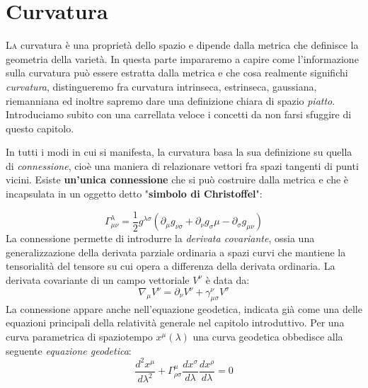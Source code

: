 \documentclass[twoside]{article}
\begin{document}
\newpage

\section{Curvatura}

\lettrine[nindent=0em,lines=3]{L}a curvatura è una proprietà dello spazio e dipende dalla metrica che definisce la geometria della varietà. In questa parte impararemo a capire come l'informazione sulla curvatura può essere estratta dalla metrica e che cosa realmente significhi \emph{curvatura}, distingueremo fra curvatura intrinseca, estrinseca, gaussiana, riemanniana ed inoltre sapremo dare una definizione chiara di spazio \emph{piatto}. Introduciamo subito con una carrellata veloce i concetti da non farsi sfuggire di questo capitolo.

In tutti i modi in cui si manifesta, la curvatura basa la sua definizione su quella di \emph{connessione}, cioè una maniera di relazionare vettori fra spazi tangenti di punti vicini. Esiste \textbf{un'unica connessione} che si può costruire dalla metrica e che è incapsulata in un oggetto detto "\textbf{simbolo di Christoffel}":

\begin{equation}\label{eq:christoffelsymbol}
	\boxed{
\Gamma_{\mu \nu}^{\lambda}= \frac{1}{2}g^{\lambda \sigma}(\partial_\mu g_{\nu \sigma} + \partial_{\nu}g_\sigma \mu- \partial_{\sigma} g_{\mu \nu}) }
\end{equation}
La connessione permette di introdurre la \emph{derivata covariante}, ossia una generalizzazione della derivata parziale ordinaria a spazi curvi che mantiene la tensorialità del tensore su cui opera a differenza della derivata ordinaria. La derivata covariante di un campo vettoriale $V^\nu$ è data da:
\begin{equation}\label{eq:covariantderivative}
\boxed{ \nabla_\mu V^\nu = \partial_\nu V^\nu + \gamma^{\nu}_{\mu \sigma}V^{\sigma} }
\end{equation}
La connessione appare anche nell'equazione geodetica, indicata già come una delle equazioni principali della relatività generale nel capitolo introduttivo. Per una curva parametrica di spaziotempo $x^\mu(\lambda)$ una curva geodetica obbedisce alla seguente \emph{equazione geodetica}:
\begin{equation}\label{eq:geodeticequation}
\boxed{ \dfrac{d^2 x^\mu}{d \lambda^2} + \Gamma^{\mu}_{\rho \sigma}\dfrac{dx^\sigma}{d\lambda}\dfrac{dx^\rho}{d\lambda}=0}
\end{equation}
\end{document}
